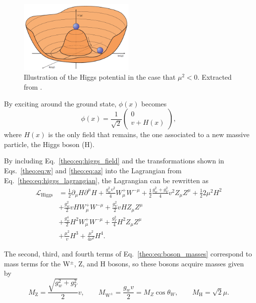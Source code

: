 \documentclass[../main.tex]{subfiles}
\begin{document}
\begin{figure}[h!]
\begin{center}
\includegraphics[width=0.5\textwidth]{Images/higgspotential}
\end{center}
\caption[Higgs potential in the case that $\mu^2 < 0$]{Illustration of the Higgs potential in the case that $\mu^2 < 0$. Extracted from \cite{intro:theo:higgs_potential_picture}.}
\label{theo:fig:higgs_potential}
\end{figure}

By exciting around the ground state, $\phi(x)$ becomes
\begin{equation}
\label{theo:eq:higgs_field}
\phi(x) = \frac{1}{\sqrt{2}}
\left(
\begin{matrix}
0 \\
v + H(x)
\end{matrix}
\right),
\end{equation}
where $H(x)$ is the only field that remains, the one associated to a new massive particle, the Higgs boson (H).

By including Eq.~\ref{theo:eq:higgs_field} and the transformations shown in Eqs.~\ref{theo:eq:w} and \ref{theo:eq:az} into the Lagrangian from Eq.~\ref{theo:eq:higgs_lagrangian}, the Lagrangian can be rewritten as
\begin{align}
\label{theo:eq:boson_masses}
\mathcal{L}_{\text{Higgs}} &= \frac{1}{2}\partial_\mu H \partial^\mu H + \frac{g_w^2 v^2}{4}W_\mu^+ W^{-\mu} + \frac{1}{2}\frac{g_w^2 + g_Y^2}{4}v^2 Z_\mu Z^\mu + \frac{1}{2}2\mu^2H^2 \\
\label{theo:eq:vvh}
&+ \frac{g_w^2}{2}vHW_\mu^+W^{-\mu} + \frac{g_Y^2}{2}vHZ_\mu Z^\mu\\
\label{theo:eq:vvhh}
&+ \frac{g_w^4}{2}H^2W_\mu^+W^{-\mu} + \frac{g_Y^2}{4}H^2Z_\mu Z^\mu\\
\label{theo:eq:hh}
&+ \frac{\mu^2}{v}H^3 + \frac{\mu^2}{4\nu^2}H^4.
\end{align}

The second, third, and fourth terms of Eq.~\eqref{theo:eq:boson_masses} correspond to mass terms for the W${}^\pm$, Z, and H bosons, so these bosons acquire masses given by
\begin{equation}
M_\text{Z} = \frac{\sqrt{g_w^2 + g_Y^2}}{2}v , \qquad M_{\text{W}^\pm}= \frac{g_w v}{2} = M_Z \cos \theta_W, \qquad M_\text{H} = \sqrt{2}\mu.
\end{equation}
\end{document}
